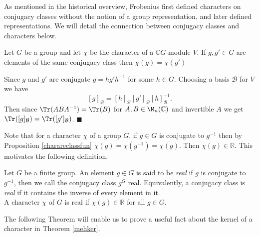 \documentclass[../Project.tex]{subfiles}
\begin{document}
As mentioned in the historical overview, Frobenius first defined characters on conjugacy classes without the notion of a group representation, and later defined representations. We will detail the connection between conjugacy classes and characters below.

\begin{prop}[{\cite[Proposition 13.5 (2)]{2}}]
	\label{charareclassfun}
	Let $G$ be a group and let $\chi$ be the character of a $\mathbb{C}G$-module $V$. If $g,g' \in G$ are elements of the same conjugacy class then $\chi(g) = \chi(g')$ 
\end{prop}
\begin{proo*}[{\cite[Proposition 13.5 (2)]{2}}]
	Since $g$ and $g'$ are conjugate $g = hg'h^{-1}$ for some $h \in G$. Choosing a basis $\mathcal{B}$ for $V$ we have
	$$[g]_\mathcal{B} = [h]_\mathcal{B}[g']_\mathcal{B}[h]_\mathcal{B}^{-1}.$$
	 Then since $\Tr(ABA^{-1}) = \Tr(B)$ for $A,B \in \M_n(\mathbb{C})$ and invertible $A$ we get
	$\Tr([g]_{\mathcal{B}}) = \Tr([g']_\mathcal{B})$. \hfill$\blacksquare$\\
\end{proo*}

Note that for a character $\chi$ of a group $G$,  if $g \in G$ is conjugate to $g^{-1}$ then by Proposition \ref{charareclassfun} $\chi(g) = \chi(g^{-1}) = \overline{\chi(g)}$. Then $\chi(g) \in \mathbb{R}$. This motivates the following definition.

\begin{defi}
	Let $G$ be a finite group. An element $g \in G$ is said to be \textit{real} if $g$ is conjugate to $g^{-1}$, then we call the conjugacy class $g^G$ real. Equivalently, a conjugacy class is \textit{real} if it contains the inverse of every element in it.\\

	A character $\chi$ of $G$ is real if $\chi(g) \in \mathbb{R}$ for all $g \in G$.\\
\end{defi}

The following Theorem will enable us to prove a useful fact about the kernel of a character in Theorem \ref{mehker}.
\end{document}
